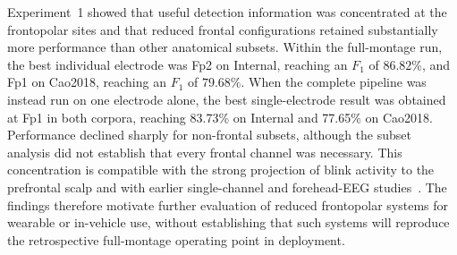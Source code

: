 Experiment~1 showed that useful detection information was concentrated at the frontopolar sites and that reduced frontal configurations retained substantially more performance than other anatomical subsets. Within the full-montage run, the best individual electrode was Fp2 on Internal, reaching an $F_1$ of $86.82\%$, and Fp1 on Cao2018, reaching an $F_1$ of $79.68\%$. When the complete pipeline was instead run on one electrode alone, the best single-electrode result was obtained at Fp1 in both corpora, reaching 83.73\% on Internal and 77.65\% on Cao2018. Performance declined sharply for non-frontal subsets, although the subset analysis did not establish that every frontal channel was necessary. This concentration is compatible with the strong projection of blink activity to the prefrontal scalp and with earlier single-channel and forehead-EEG studies~\citep{chang2016detection,ko2020eyeblink,zhang2023method,tran2021detection,valderrama2018automatic,wang2025sliding,shahbakhti2022simultaneous,aoki2023drowsiness,lopezahumada2023hardware}. The findings therefore motivate further evaluation of reduced frontopolar systems for wearable or in-vehicle use, without establishing that such systems will reproduce the retrospective full-montage operating point in deployment.
